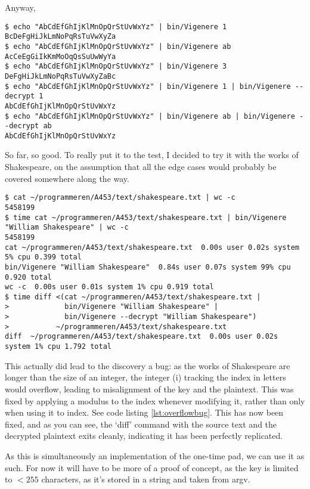 \documentclass{article}
\begin{document}
    Anyway,

\begin{lstlisting}[caption=Testing bin/Vigenere]
$ echo "AbCdEfGhIjKlMnOpQrStUvWxYz" | bin/Vigenere 1
BcDeFgHiJkLmNoPqRsTuVwXyZa
$ echo "AbCdEfGhIjKlMnOpQrStUvWxYz" | bin/Vigenere ab
AcCeEgGiIkKmMoOqQsSuUwWyYa
$ echo "AbCdEfGhIjKlMnOpQrStUvWxYz" | bin/Vigenere 3 
DeFgHiJkLmNoPqRsTuVwXyZaBc
$ echo "AbCdEfGhIjKlMnOpQrStUvWxYz" | bin/Vigenere 1 | bin/Vigenere --decrypt 1
AbCdEfGhIjKlMnOpQrStUvWxYz
$ echo "AbCdEfGhIjKlMnOpQrStUvWxYz" | bin/Vigenere ab | bin/Vigenere --decrypt ab
AbCdEfGhIjKlMnOpQrStUvWxYz
\end{lstlisting}
\iffalse $ \fi %

    So far, so good. To really put it to the test, I decided to try it with the
    works of Shakespeare, on the assumption that all the edge cases would
    probably be covered somewhere along the way.

\begin{lstlisting}[caption=Shakespeare]
$ cat ~/programmeren/A453/text/shakespeare.txt | wc -c                                          
5458199
$ time cat ~/programmeren/A453/text/shakespeare.txt | bin/Vigenere "William Shakespeare" | wc -c
5458199
cat ~/programmeren/A453/text/shakespeare.txt  0.00s user 0.02s system 5% cpu 0.399 total
bin/Vigenere "William Shakespeare"  0.84s user 0.07s system 99% cpu 0.920 total
wc -c  0.00s user 0.01s system 1% cpu 0.919 total
$ time diff <(cat ~/programmeren/A453/text/shakespeare.txt |
>             bin/Vigenere "William Shakespeare" |
>             bin/Vigenere --decrypt "William Shakespeare")
>           ~/programmeren/A453/text/shakespeare.txt 
diff  ~/programmeren/A453/text/shakespeare.txt  0.00s user 0.02s system 1% cpu 1.792 total
\end{lstlisting}
\iffalse $ \fi %

    This actually did lead to the discovery a bug: as the works of Shakespeare
    are longer than the size of an integer, the integer (i) tracking the index
    in letters would overflow, leading to misalignment of the key and the
    plaintext. This was fixed by applying a modulus to the index whenever
    modifying it, rather than only when using it to index. See code listing
    \ref{lst:overflowbug}. This has now been fixed, and as you can see, the
    `diff' command with the source text and the decrypted plaintext exits
    cleanly, indicating it has been perfectly replicated.

    As this is simultaneously an implementation of the one-time pad, we can use
    it as such. For now it will have to be more of a proof of concept, as the
    key is limited to $< 255$ characters, as it's stored in a string and taken
    from argv.
\end{document}
